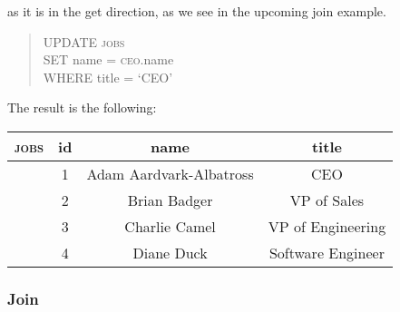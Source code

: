 \documentclass{article}
\begin{document}
as it is in the get direction, as we see in the upcoming join example.
\begin{quote}
    UPDATE \textsc{jobs} \\
    SET name = \textsc{ceo}.name \\
    WHERE title = `CEO' 
\end{quote}
The result is the following:
\begin{center} \begin{tabular} {c | c c c}
    \textsc{jobs} & id & name & title \\
    \hline
    & 1 & Adam Aardvark-Albatross & CEO \\
    & 2 & Brian Badger & VP of Sales \\
    & 3 & Charlie Camel & VP of Engineering \\
    & 4 & Diane Duck & Software Engineer
\end{tabular} \end{center}

\subsubsection*{Join}
\end{document}
